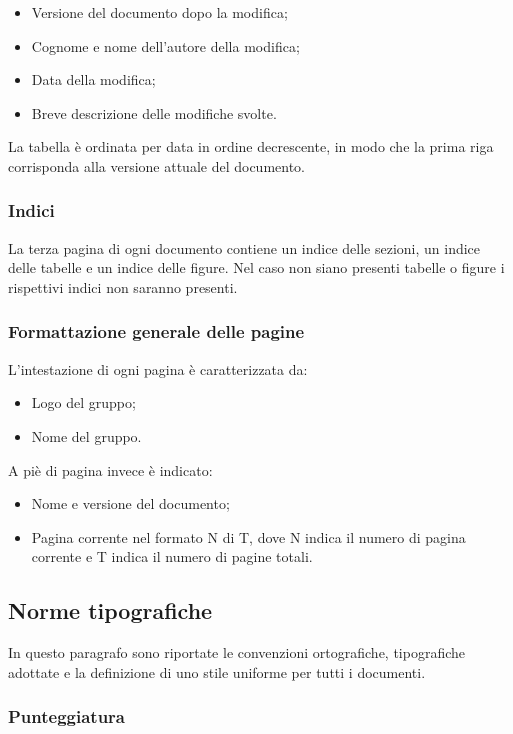 \begin{itemize}
\item Versione del documento dopo la modifica;
\item Cognome e nome dell'autore della modifica;
\item Data della modifica;
\item Breve descrizione delle modifiche svolte.
\end{itemize}

La tabella è ordinata per data in ordine decrescente, in modo che la prima riga corrisponda alla versione attuale del documento.

\subsubsection{Indici}
La terza pagina di ogni documento contiene un indice delle sezioni, un indice delle tabelle e un indice delle figure. Nel caso non siano presenti tabelle o figure i rispettivi indici non saranno presenti.

\subsubsection{Formattazione generale delle pagine}
L'intestazione di ogni pagina è caratterizzata da:

\begin{itemize}
\item Logo del gruppo;
\item Nome del gruppo.
\end{itemize} 

A piè di pagina invece è indicato:

\begin{itemize}
\item Nome e versione del documento;
\item Pagina corrente nel formato N di T, dove N indica il numero di pagina corrente e T indica il numero di pagine totali.
\end{itemize} 

\subsection{Norme tipografiche}
In questo paragrafo sono riportate le convenzioni ortografiche, tipografiche adottate e la definizione di uno stile uniforme per tutti i documenti.

\subsubsection{Punteggiatura}


